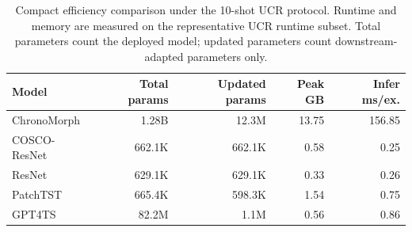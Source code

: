 \begin{table}[t]
\centering
\caption{Compact efficiency comparison under the 10-shot UCR protocol. Runtime and memory are measured on the representative UCR runtime subset. Total parameters count the deployed model; updated parameters count downstream-adapted parameters only.}
\label{tab:efficiency-compact}
\begin{tabular}{lrrrr}
\toprule
Model & Total params & Updated params & Peak GB & Infer ms/ex. \\
\midrule
ChronoMorph & 1.28B & 12.3M & 13.75 & 156.85 \\
COSCO-ResNet & 662.1K & 662.1K & 0.58 & 0.25 \\
ResNet & 629.1K & 629.1K & 0.33 & 0.26 \\
PatchTST & 665.4K & 598.3K & 1.54 & 0.75 \\
GPT4TS & 82.2M & 1.1M & 0.56 & 0.86 \\
\bottomrule
\end{tabular}
\end{table}
